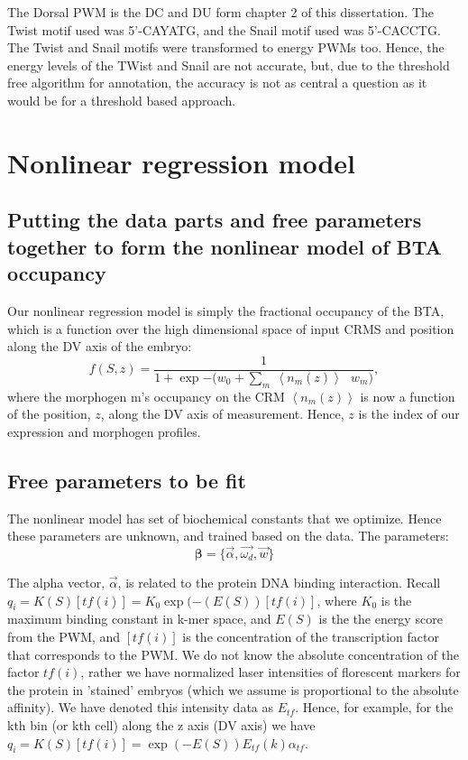 The Dorsal PWM is the DC and DU form chapter 2 of this dissertation.  The Twist motif used was 5'-CAYATG, and the Snail motif used was 5'-CACCTG.  The Twist and Snail motifs were transformed to energy PWMs too.  Hence, the energy levels of the TWist and Snail are not accurate, but, due to the threshold free algorithm for annotation, the accuracy is not as central a question as it would be for a threshold based approach.

\section{Nonlinear regression model }
\subsection{ Putting the data parts and free parameters together to form the nonlinear model of BTA occupancy }
Our nonlinear regression model is simply the fractional occupancy of the BTA, which is a function over the high dimensional space of input CRMS and position along the DV axis of the embryo:
\begin{equation}\label{modelz}
f( S,z ) =  \frac{1}{1 + \exp{ -(w_{0} + \sum_{m}  \  \left< n_m(z) \right> \ \ \ w_{m}})},
\end{equation}
where the morphogen m's occupancy on the CRM $\left< n_m(z) \right>$ is now a function of the position, $z$, along the DV axis of measurement.  Hence, $z$ is the index of our expression and morphogen profiles.
 


\subsection{Free parameters to be fit}
  
The nonlinear model has set of biochemical constants that we optimize.  Hence these parameters are unknown, and trained based on the data.  The parameters:
\begin{equation}\label{freeparams}
        \mathbf{\beta}=\{ \overrightarrow{\alpha},\overrightarrow{\omega_{ d}} ,\overrightarrow{w} \}
    \end{equation}
  
The alpha vector, $\overrightarrow{\alpha}$, is related to the protein DNA binding interaction.  Recall $q_i=K(S)[tf(i)] = K_0\exp{(-(E(S))}[tf(i)]$, where $K_0$ is the maximum binding constant in k-mer space, and $E(S)$ is the the energy score from the PWM, and $[tf(i)]$ is the concentration of the transcription factor that corresponds to the PWM.  We do not know the absolute concentration of the factor $tf(i)$, rather we have normalized laser intensities of florescent markers for the protein in 'stained' embryos (which we assume is proportional to the absolute affinity).  We have denoted this intensity data as $E_{tf}$.  Hence, for example, for the kth bin (or kth cell) along the z axis (DV axis) we have $q_i=K(S)[tf(i)] = \exp{(-E(S))}E_{tf}(k) \alpha_{tf}$.   

